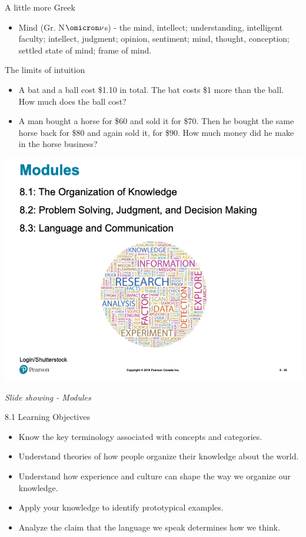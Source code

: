 \documentclass[
]{book}
\providecommand{\tightlist}{%
  \setlength{\itemsep}{0pt}\setlength{\parskip}{0pt}}
\begin{document}
A little more Greek

\begin{itemize}
\tightlist
\item
  Mind (Gr. N\(\omicron\nu\)s) - the mind, intellect; understanding, intelligent faculty; intellect, judgment; opinion, sentiment; mind, thought, conception; settled state of mind; frame of mind.
\end{itemize}

The limits of intuition

\begin{itemize}
\tightlist
\item
  A bat and a ball cost \$1.10 in total. The bat costs \$1 more than the ball. How much does the ball cost?\\
\item
  A man bought a horse for \$60 and sold it for \$70. Then he bought the same horse back for \$80 and again sold it, for \$90. How much money did he make in the horse business?
\end{itemize}

\includegraphics{assets/unit_1/slide_39.png}

\emph{Slide showing - Modules}

8.1 Learning Objectives

\begin{itemize}
\tightlist
\item
  Know the key terminology associated with concepts and categories.\\
\item
  Understand theories of how people organize their knowledge about the world.\\
\item
  Understand how experience and culture can shape the way we organize our knowledge.\\
\item
  Apply your knowledge to identify prototypical examples.\\
\item
  Analyze the claim that the language we speak determines how we think.
\end{itemize}
\end{document}
